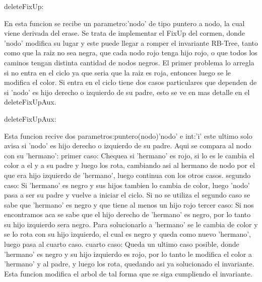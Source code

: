 
deleteFixUp:

En esta funcion se recibe un parametro:'nodo' de tipo puntero a nodo, la cual viene derivada del erase. Se trata de implementar el FixUp del cormen, donde 'nodo' modifica su lugar y este puede llegar a romper el invariante RB-Tree, tanto como que la raiz no sea negra, que cada nodo rojo tenga hijo rojo, o que todos los caminos tengan distinta cantidad de nodos negros. El primer problema lo arregla si no entra en el ciclo ya que seria que la raiz es roja, entonces luego se le modifica el color. Si entra en el ciclo tiene dos casos particulares que dependen de si 'nodo' es hijo derecho o izquierdo de su padre, esto se ve en mas detalle en el deleteFixUpAux. 

deleteFixUpAux:


Esta funcion recive dos parametros:puntero(nodo)'nodo' e int:'i' este ultimo solo avisa si 'nodo' es hijo derecho o izquierdo de su padre. Aqui se compara al nodo con su 'hermano': 
primer caso: Chequea si 'hermano' es rojo, si lo es le cambia el color a el y a su padre y luego los rota, cambiando asi al hermano de nodo por el que era hijo izquierdo de 'hermano', luego continua con los otros casos.
segundo caso: Si 'hermano' es negro y sus hijos tambien lo cambia de color, luego 'nodo' pasa a ser su padre y vuelve a iniciar el ciclo.
Si no se utiliza el segundo caso se sabe que 'hermano' es negro y que tiene al menos un hijo rojo
tercer caso: Si nos encontramos aca se sabe que el hijo derecho de 'hermano' es negro, por lo tanto su hijo izquierdo sera negro. Para solucionarlo a 'hermano' se le cambia de color y se lo rota con su hijo izquierdo, el cual es negro y queda como nuevo 'hermano', luego pasa al cuarto caso.
cuarto caso: Queda un ultimo caso posible, donde 'hermano' es negro y su hijo izquierdo es rojo, por lo tanto le modifica el color a 'hermano' y al padre, y luego los rota, quedando asi ya solucionado el invariante.
Esta funcion modifica el arbol de tal forma que se siga cumpliendo el invariante.
